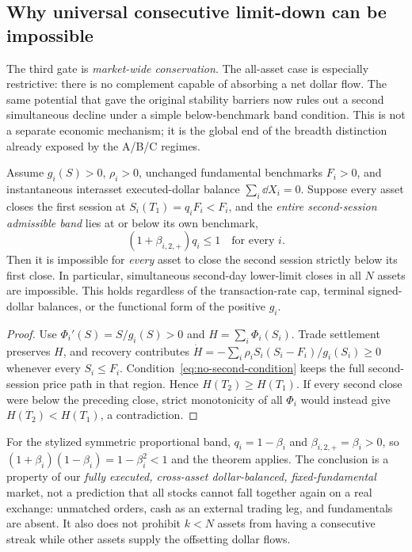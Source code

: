 \documentclass[review,hidelinks,onefignum,onetabnum]{siamonline250211}
\begin{document}
\subsection{Why universal consecutive limit-down can be impossible}\label{subsec:multiday-full}
The third gate is \emph{market-wide conservation}. The all-asset case is especially restrictive: there is no complement capable of absorbing a net dollar flow. The same potential that gave the original stability barriers now rules out a second simultaneous decline under a simple below-benchmark band condition. This is not a separate economic mechanism; it is the global end of the breadth distinction already exposed by the A/B/C regimes.
\begin{theorem}\label{thm:no-second-global}
Assume $g_i(S)>0$, $\rho_i>0$, unchanged fundamental benchmarks $F_i>0$, and instantaneous interasset executed-dollar balance $\sum_i\dd X_i=0$. Suppose every asset closes the first session at $S_i(T_1)=q_iF_i<F_i$, and the \emph{entire second-session admissible band} lies at or below its own benchmark,
\begin{equation}\label{eq:no-second-condition}
 (1+\beta_{i,2,+})q_i\le1\quad\text{for every }i.
\end{equation}
Then it is impossible for \emph{every} asset to close the second session strictly below its first close. In particular, simultaneous second-day lower-limit closes in all $N$ assets are impossible. This holds regardless of the transaction-rate cap, terminal signed-dollar balances, or the functional form of the positive $g_i$.
\end{theorem}
\begin{proof}
Use $\Phi_i'(S)=S/g_i(S)>0$ and $H=\sum_i\Phi_i(S_i)$. Trade settlement preserves $H$, and recovery contributes
$\dot H=-\sum_i\rho_i S_i(S_i-F_i)/g_i(S_i)\ge0$ whenever every $S_i\le F_i$.
Condition~\eqref{eq:no-second-condition} keeps the full second-session price path in that region. Hence $H(T_2)\ge H(T_1)$. If every second close were below the preceding close, strict monotonicity of all $\Phi_i$ would instead give $H(T_2)<H(T_1)$, a contradiction.
\end{proof}

For the stylized symmetric proportional band, $q_i=1-\beta_i$ and
$\beta_{i,2,+}=\beta_i>0$, so
$(1+\beta_i)(1-\beta_i)=1-\beta_i^2<1$ and the theorem applies. The conclusion is a property of our \emph{fully executed, cross-asset dollar-balanced, fixed-fundamental} market, not a prediction that all stocks cannot fall together again on a real exchange: unmatched orders, cash as an external trading leg, and fundamentals are absent. It also does not prohibit $k<N$ assets from having a consecutive streak while other assets supply the offsetting dollar flows.
\end{document}
